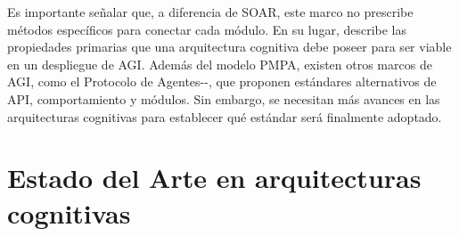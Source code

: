 Es importante señalar que, a diferencia de SOAR, este marco no prescribe métodos
específicos para conectar cada módulo. En su lugar, describe las propiedades
primarias que una arquitectura cognitiva debe poseer para ser viable en un
despliegue de AGI. Además del modelo PMPA, existen otros marcos de AGI, como el
Protocolo de Agentes-\citet{engineerfoundation2023ap}-, que proponen estándares
alternativos de API, comportamiento y módulos. Sin embargo, se necesitan más
avances en las arquitecturas cognitivas para establecer qué estándar será
finalmente adoptado.

\section {Estado del Arte en arquitecturas cognitivas}


